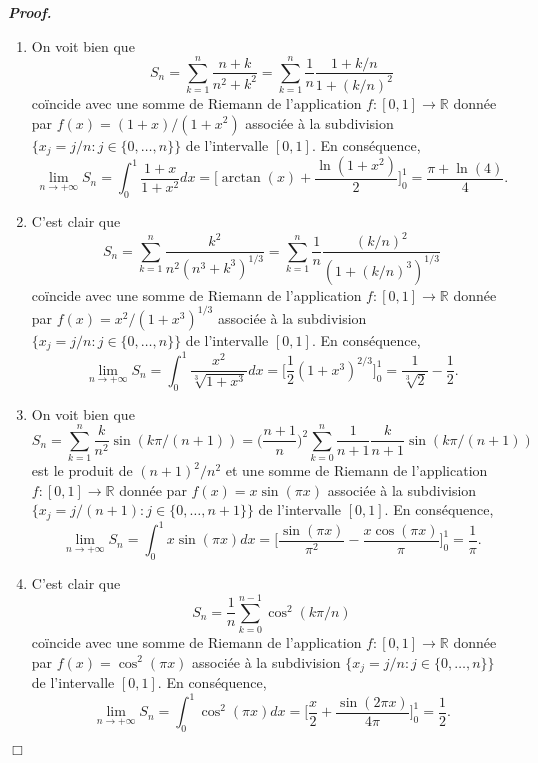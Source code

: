 \documentclass[11pt,a4paper]{article}
\newcommand{\RR}{\mathbb{R}}
\newenvironment{preuve}[1][]
{\vskip 2mm  \noindent\emph{\bf Proof#1. }}{$\Box$ \vskip 2mm}
\begin{document}
	\begin{preuve}
		\begin{enumerate}
			\item On voit bien que 
			\[      S_n=\sum_{k=1}^n \frac{n+k}{n^2+k^2} = \sum_{k=1}^n \frac{1}{n} \frac{1+k/n}{1+(k/n)^2}     \]
			coïncide avec une somme de Riemann de l'application $f : [0,1] \rightarrow \RR$ donnée par $f(x) = (1+x)/(1+x^{2})$ 
			associée à la subdivision $\{ x_{j} = j/n : j \in \{0, \dots, n\} \}$ de l'intervalle $[0,1]$. 
			En conséquence, 
			\[     \underset{n \rightarrow +\infty}{\lim} S_{n} = \int_{0}^{1} \frac{1+x}{1+x^{2}} dx = \bigg[ \arctan(x) + \frac{\ln(1+x^{2})}{2} \bigg]_{0}^{1} = \frac{\pi + \ln(4)}{4}.     \]
			
			\item C'est clair que 
			\[      S_n=\sum_{k=1}^n \frac{k^2}{n^2(n^3+k^3)^{1/3}} = \sum_{k=1}^n \frac{1}{n} \frac{(k/n)^2}{(1+(k/n)^3)^{1/3}}     \]
			coïncide avec une somme de Riemann de l'application $f : [0,1] \rightarrow \RR$ donnée par $f(x) = x^{2}/(1+x^{3})^{1/3}$ 
			associée à la subdivision $\{ x_{j} = j/n : j \in \{0, \dots, n\} \}$ de l'intervalle $[0,1]$. 
			En conséquence, 
			\[     \underset{n \rightarrow +\infty}{\lim} S_{n} = \int_{0}^{1} \frac{x^{2}}{\sqrt[3]{1+x^{3}}} dx = \bigg[ \frac{1}{2} (1+x^{3}) ^{2/3} \bigg]_{0}^{1} = \frac{1}{\sqrt[3]{2}} - \frac{1}{2}.     \]
			
			\item On voit bien que 
			\[      S_n =\sum_{k=1}^n \frac{k}{n^2}\sin (k\pi/(n+1)) = \bigg(\frac{n+1}{n}\bigg)^{2} \sum_{k=0}^n \frac{1}{n+1} \frac{k}{n+1}\sin (k\pi/(n+1))     \]
			est le produit de $(n+1)^{2}/n^{2}$ et une somme de Riemann de l'application $f : [0,1] \rightarrow \RR$ donnée par $f(x) = x \sin(\pi x)$ 
			associée à la subdivision $\{ x_{j} = j/(n+1) : j \in \{0, \dots, n+1\} \}$ de l'intervalle $[0,1]$. 
			En conséquence, 
			\[     \underset{n \rightarrow +\infty}{\lim} S_{n} = \int_{0}^{1} x \sin(\pi x) dx = \bigg[ \frac{\sin(\pi x)}{\pi^{2}} - \frac{x \cos(\pi x)}{\pi} \bigg]_{0}^{1} = \frac{1}{\pi}.     \]
			
			\item C'est clair que 
			\[      S_n =\frac{1}{n}\sum_{k=0}^{n-1}\cos^2(k\pi/n)     \] 
			coïncide avec une somme de Riemann de l'application $f : [0,1] \rightarrow \RR$ donnée par $f(x) = \cos^{2}(\pi x)$ 
			associée à la subdivision $\{ x_{j} = j/n : j \in \{0, \dots, n\} \}$ de l'intervalle $[0,1]$. 
			En conséquence, 
			\[     \underset{n \rightarrow +\infty}{\lim} S_{n} = \int_{0}^{1} \cos^{2}(\pi x) dx = \bigg[ \frac{x}{2} + \frac{\sin(2 \pi x)}{4 \pi} \bigg]_{0}^{1} = \frac{1}{2}.     \]
			

\end{enumerate}
\end{preuve}
\end{document}
